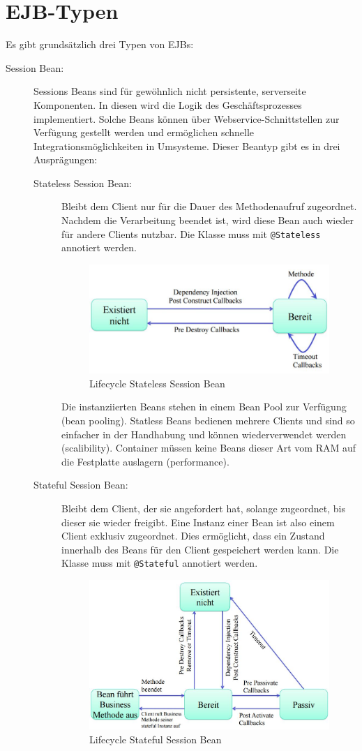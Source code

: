 \section{EJB-Typen}
Es gibt grundsätzlich drei Typen von EJBs:
\begin{description}
	\item[Session Bean:]
		Sessions Beans sind für gewöhnlich nicht persistente, serverseite Komponenten. In diesen wird die Logik des Geschäftsprozesses implementiert. Solche Beans können über Webservice-Schnittstellen zur Verfügung gestellt werden und ermöglichen schnelle Integrationsmöglichkeiten in Umsysteme. Dieser Beantyp gibt es in drei Ausprägungen:
		\begin{description}
			\item[Stateless Session Bean:] Bleibt dem Client nur für die Dauer des Methodenaufruf zugeordnet. Nachdem die Verarbeitung beendet ist, wird diese Bean auch wieder für andere Clients nutzbar. Die Klasse muss mit \verb|@Stateless| annotiert werden.
			
			\begin{figure}[h!]
			\centering
			\includegraphics[width=0.5\linewidth]{fig/ejb-lifecycle-statless-bean}
			\caption{Lifecycle Stateless Session Bean}
			\label{fig:ejb-lifecycle-stateless-bean}
			\end{figure}
			
			Die instanziierten Beans stehen in einem Bean Pool zur Verfügung (bean pooling). Statless Beans bedienen mehrere Clients und sind so einfacher in der Handhabung und können wiederverwendet werden (scalibility). Container müssen keine Beans dieser Art vom RAM auf die Festplatte auslagern (performance).
			
			\item[Stateful Session Bean:] Bleibt dem Client, der sie angefordert hat, solange zugeordnet, bis dieser sie wieder freigibt. Eine Instanz einer Bean ist also einem Client exklusiv zugeordnet. Dies ermöglicht, dass ein Zustand innerhalb des Beans für den Client gespeichert werden kann. Die Klasse muss mit \verb|@Stateful| annotiert werden.
			
			\begin{figure}[h!]
			\centering
			\includegraphics[width=0.5\linewidth]{fig/ejb-lifecycle-statefull-bean}
			\caption{Lifecycle Stateful Session Bean}
			\label{fig:ejb-lifecycle-statefull-bean}
			\end{figure}
			

\end{description}
\end{description}

